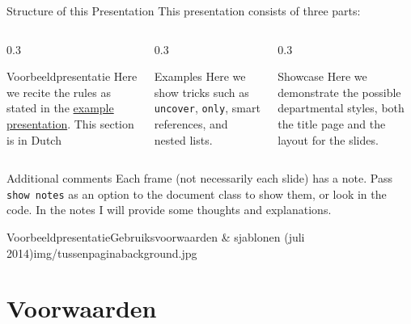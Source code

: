 \documentclass[department=none, notes={show notes}, slidesperpage=4, official=true, handout]{beamerruhuisstijl}
\begin{document}
\begin{frame}{Structure of this Presentation}
	This presentation consists of three parts:
    \begin{columns}[T,totalwidth=\linewidth]
        \begin{column}{0.3\textwidth}
            \begin{block}{Voorbeeldpresentatie}
            	Here we recite the rules as stated in the \href{http://www.ru.nl/publish/pages/596464/ru_powerpoint_algemeen_2014_toelichting.ppt}{example presentation}. This section is in Dutch
            \end{block}
        \end{column}
        \begin{column}{0.3\textwidth}
            \begin{block}{Examples}
            	Here we show tricks such as \texttt{uncover}, \texttt{only}, smart references, and nested lists.
            \end{block}
        \end{column}
        \begin{column}{0.3\textwidth}
            \begin{block}{Showcase}
            	Here we demonstrate the possible departmental styles, both the title page and the layout for the slides.
            \end{block}
        \end{column}
    \end{columns}
    
    \begin{block}{Additional comments}
      Each frame (not necessarily each slide) has a note. Pass \texttt{show notes} as an option to the document class to show them, or look in the code. In the notes I will provide some thoughts and explanations.
	\end{block}
\end{frame}
\note{
	
}



\begin{tussenpagina}{Voorbeeldpresentatie}{Gebruiksvoorwaarden \& sjablonen (juli 2014)}{img/tussenpaginabackground.jpg}
\end{tussenpagina}
\note{}

\section{Voorwaarden}
\end{document}
